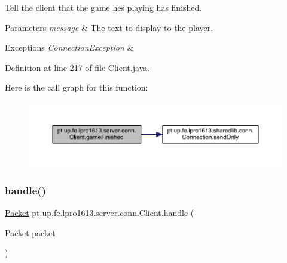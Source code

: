 Tell the client that the game he\textquotesingle{}s playing has finished.


\begin{DoxyParams}{Parameters}
{\em message} & The text to display to the player. \\
\hline
\end{DoxyParams}

\begin{DoxyExceptions}{Exceptions}
{\em Connection\+Exception} & \\
\hline
\end{DoxyExceptions}


Definition at line 217 of file Client.\+java.

Here is the call graph for this function\+:
\nopagebreak
\begin{figure}[H]
\begin{center}
\leavevmode
\includegraphics[width=350pt]{classpt_1_1up_1_1fe_1_1lpro1613_1_1server_1_1conn_1_1_client_a58789376953d4b6f316a48627dffbae1_cgraph}
\end{center}
\end{figure}
\hypertarget{classpt_1_1up_1_1fe_1_1lpro1613_1_1server_1_1conn_1_1_client_a81efbd1e6b06189da5c814ac767a4a98}{}\label{classpt_1_1up_1_1fe_1_1lpro1613_1_1server_1_1conn_1_1_client_a81efbd1e6b06189da5c814ac767a4a98} 
\subsubsection{\texorpdfstring{handle()}{handle()}}
{\footnotesize\ttfamily \hyperlink{classpt_1_1up_1_1fe_1_1lpro1613_1_1sharedlib_1_1conn_1_1_packet}{Packet} pt.\+up.\+fe.\+lpro1613.\+server.\+conn.\+Client.\+handle (\begin{DoxyParamCaption}\item[{\hyperlink{classpt_1_1up_1_1fe_1_1lpro1613_1_1sharedlib_1_1conn_1_1_packet}{Packet}}]{packet }\end{DoxyParamCaption})}

